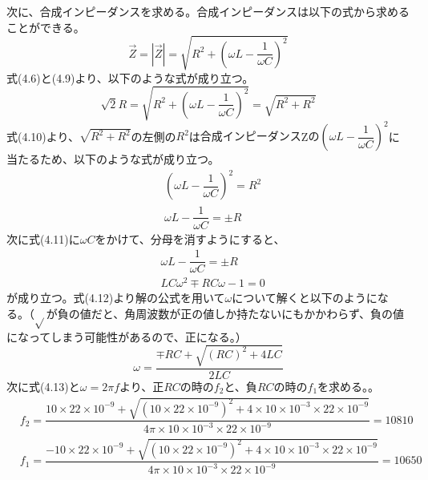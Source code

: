 \documentclass[12pt,a4paper]{jsarticle}
\numberwithin{equation}{section}
\numberwithin{figure}{section}
\numberwithin{table}{section}
\begin{document}
      次に、合成インピーダンスを求める。合成インピーダンスは以下の式から求めることができる。
      \begin{equation}
        \vec{Z}=|\vec{Z}|=\sqrt{R^2 + (\omega L - \dfrac{1}{\omega C})^2}
      \end{equation}
      式(4.6)と(4.9)より、以下のような式が成り立つ。
      \begin{equation}
        \sqrt{2}R=\sqrt{R^2 + (\omega L - \dfrac{1}{\omega C})^2}=\sqrt{R^2 + R^2}
      \end{equation}
      式(4.10)より、$\sqrt{R^2 + R^2}$の左側の$R^2$は$合成インピーダンス$Z$の(\omega L - \dfrac{1}{\omega C})^2$に当たるため、以下のような式が成り立つ。
      \begin{equation}
        \begin{split}
          &(\omega L - \dfrac{1}{\omega C})^2=R^2\\
          &\omega L - \dfrac{1}{\omega C}=\pm R
        \end{split}
      \end{equation}
      次に式(4.11)に$\omega C$をかけて、分母を消すようにすると、
      \begin{equation}
        \begin{split}
          &\omega L - \dfrac{1}{\omega C}=\pm R\\
          &LC \omega^2 \mp RC \omega -1=0
        \end{split}
      \end{equation}
      が成り立つ。式(4.12)より解の公式を用いて$\omega$について解くと以下のようになる。（$\sqrt{}$が負の値だと、角周波数が正の値しか持たないにもかかわらず、負の値になってしまう可能性があるので、正になる。）
      \begin{equation}
        \omega = \dfrac{\mp RC + \sqrt{(RC)^2 + 4 LC}}{2LC}
      \end{equation}
      次に式(4.13)と$\omega=2 \pi f$より、正$RC$の時の$f_2$と、負$RC$の時の$f_1$を求める。。
      \begin{equation}
        \begin{split}
          &f_2=\dfrac{10 \times 22 \times 10^{-9} + \sqrt{(10 \times 22 \times 10^{-9})^2 + 4 \times 10 \times 10^{-3} \times 22 \times 10^{-9}}}{4 \pi \times 10 \times 10^{-3} \times 22 \times 10^{-9}}=10810\\
          &f_1=\dfrac{-10 \times 22 \times 10^{-9} + \sqrt{(10 \times 22 \times 10^{-9})^2 + 4 \times 10 \times 10^{-3} \times 22 \times 10^{-9}}}{4 \pi \times 10 \times 10^{-3} \times 22 \times 10^{-9}}=10650
        \end{split}
      \end{equation}
\end{document}

